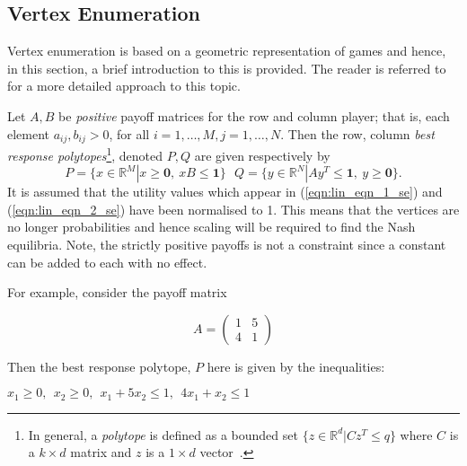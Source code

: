 \subsection{Vertex Enumeration}\label{subsec:Vertex_Enumeration}
Vertex enumeration is based on a geometric representation of games and hence,
in this section, a brief introduction to this is provided. The reader is
referred to~\cite{NoamNisan2007} for a more detailed approach to this topic.

\begin{definition}
    Let \(A, B\) be \emph{positive} payoff matrices for the row and column
    player; that is, each element \(a_{ij}, b_{ij} > 0\), for all \(i = 1,
    \ldots, M, j = 1, \ldots, N\). Then the row, column
    \textit{best response polytopes}\footnote{In general, a
    \emph{polytope} is defined as a bounded set \( \{z \in \mathbb{R}^{d} |
    Cz^{T} \le q\} \) where \(C\) is a \(k \times d\) matrix and \(z\) is a \(1
    \times d\) vector~\cite{NoamNisan2007}.}, denoted \(P, Q\) are given respectively by
    \begin{equation}
        P = \{x \in \mathbb{R}^{M} | x \ge \textbf{0}, ~ xB \le \textbf{1}\} ~~~
        Q = \{y \in \mathbb{R}^{N} | Ay^{T} \le \textbf{1}, ~ y \ge \textbf{0}\}.
    \end{equation}\label{def:best_resp_polytopes}
    It is assumed that the utility values which appear
    in (\ref{eqn:lin_eqn_1_se}) and (\ref{eqn:lin_eqn_2_se}) have been normalised
    to 1. This means that the vertices are no longer probabilities and hence
    scaling will be required to find the Nash equilibria. Note, the strictly
    positive payoffs is not a constraint since a constant can be added to each
    with no effect. 
\end{definition}


For example, consider the payoff matrix 

\begin{equation}\label{eqn:ex_vert_en}
    A = \begin{pmatrix}
        1 & 5 \\
        4 & 1
    \end{pmatrix}
\end{equation}

Then the best response polytope, \(P\) here is given by the inequalities:
\begin{center}
    \(
        x_{1} \ge 0, ~~
        x_{2} \ge 0, ~~
        x_{1} + 5x_{2} \le 1, ~~
        4x_{1} + x_{2} \le 1
    \)
\end{center}

